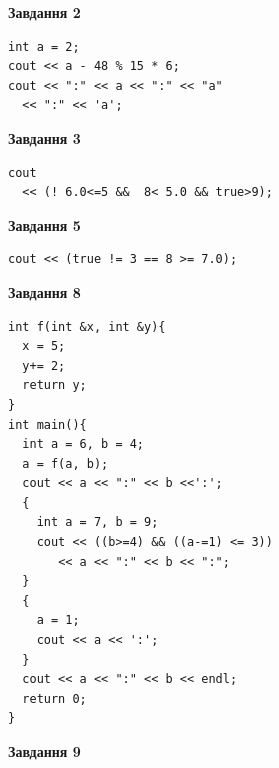 \documentclass[12pt, ukrainian]{article}
\begin{document}
{\begin {large}
\begin{minipage}[t]{7.0cm}
\end{minipage}
\vline \hspace{1mm}
\begin{minipage}[t]{11.0cm}

\begin{center}
\textbf{Завдання 2}
\end{center}
\vspace{-8mm}

\begin{verbatim}
int a = 2;
cout << a - 48 % 15 * 6;
cout << ":" << a << ":" << "a" 
  << ":" << 'a';
\end{verbatim}



\begin{center}
\textbf{Завдання 3}
\end{center}
\vspace{-8mm}

\begin{verbatim}
cout 
  << (! 6.0<=5 &&  8< 5.0 && true>9);
\end{verbatim}



\begin{center}
\textbf{Завдання 5}
\end{center}
\vspace{-8mm}

\begin{verbatim}
cout << (true != 3 == 8 >= 7.0);
\end{verbatim}



\begin{center}
\textbf{Завдання 8}
\end{center}
\vspace{-8mm}

\begin{verbatim}
int f(int &x, int &y){
  x = 5;
  y+= 2;
  return y;
}
int main(){
  int a = 6, b = 4;
  a = f(a, b);
  cout << a << ":" << b <<':';
  {
    int a = 7, b = 9;
    cout << ((b>=4) && ((a-=1) <= 3))
       << a << ":" << b << ":";
  }
  {
    a = 1;
    cout << a << ':';
  }
  cout << a << ":" << b << endl;
  return 0;
}
\end{verbatim}

\end{minipage}


\begin{minipage}[t]{7.0cm}

\begin{center}
\textbf{Завдання 9}
\end{center}
\vspace{-8mm}


\end{minipage}
\end{large}}
\end{document}

